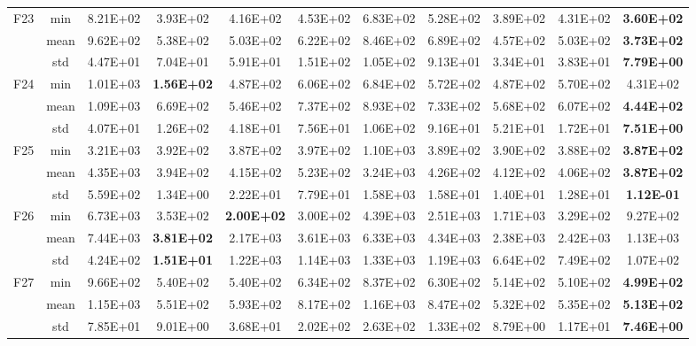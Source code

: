 \documentclass[preprint,review,compress,12pt]{elsarticle}
\begin{document}
\begin{table}[H]
{\begin{tabular}{ccccccccccc}
    \multirow{3}[0]{*}{F23} & min   & 8.21E+02 & 3.93E+02 & 4.16E+02 & 4.53E+02 & 6.83E+02 & 5.28E+02 & 3.89E+02 & 4.31E+02 & \textbf{3.60E+02} \\
          & mean  & 9.62E+02 & 5.38E+02 & 5.03E+02 & 6.22E+02 & 8.46E+02 & 6.89E+02 & 4.57E+02 & 5.03E+02 & \textbf{3.73E+02} \\
          & std   & 4.47E+01 & 7.04E+01 & 5.91E+01 & 1.51E+02 & 1.05E+02 & 9.13E+01 & 3.34E+01 & 3.83E+01 & \textbf{7.79E+00} \\
    \multirow{3}[0]{*}{F24} & min   & 1.01E+03 & \textbf{1.56E+02} & 4.87E+02 & 6.06E+02 & 6.84E+02 & 5.72E+02 & 4.87E+02 & 5.70E+02 & 4.31E+02 \\
          & mean  & 1.09E+03 & 6.69E+02 & 5.46E+02 & 7.37E+02 & 8.93E+02 & 7.33E+02 & 5.68E+02 & 6.07E+02 & \textbf{4.44E+02} \\
          & std   & 4.07E+01 & 1.26E+02 & 4.18E+01 & 7.56E+01 & 1.06E+02 & 9.16E+01 & 5.21E+01 & 1.72E+01 & \textbf{7.51E+00} \\
    \multirow{3}[0]{*}{F25} & min   & 3.21E+03 & 3.92E+02 & 3.87E+02 & 3.97E+02 & 1.10E+03 & 3.89E+02 & 3.90E+02 & 3.88E+02 & \textbf{3.87E+02} \\
          & mean  & 4.35E+03 & 3.94E+02 & 4.15E+02 & 5.23E+02 & 3.24E+03 & 4.26E+02 & 4.12E+02 & 4.06E+02 & \textbf{3.87E+02} \\
          & std   & 5.59E+02 & 1.34E+00 & 2.22E+01 & 7.79E+01 & 1.58E+03 & 1.58E+01 & 1.40E+01 & 1.28E+01 & \textbf{1.12E-01} \\
    \multirow{3}[0]{*}{F26} & min   & 6.73E+03 & 3.53E+02 & \textbf{2.00E+02} & 3.00E+02 & 4.39E+03 & 2.51E+03 & 1.71E+03 & 3.29E+02 & 9.27E+02 \\
          & mean  & 7.44E+03 & \textbf{3.81E+02} & 2.17E+03 & 3.61E+03 & 6.33E+03 & 4.34E+03 & 2.38E+03 & 2.42E+03 & 1.13E+03 \\
          & std   & 4.24E+02 & \textbf{1.51E+01} & 1.22E+03 & 1.14E+03 & 1.33E+03 & 1.19E+03 & 6.64E+02 & 7.49E+02 & 1.07E+02 \\
    \multirow{3}[0]{*}{F27} & min   & 9.66E+02 & 5.40E+02 & 5.40E+02 & 6.34E+02 & 8.37E+02 & 6.30E+02 & 5.14E+02 & 5.10E+02 & \textbf{4.99E+02} \\
          & mean  & 1.15E+03 & 5.51E+02 & 5.93E+02 & 8.17E+02 & 1.16E+03 & 8.47E+02 & 5.32E+02 & 5.35E+02 & \textbf{5.13E+02} \\
          & std   & 7.85E+01 & 9.01E+00 & 3.68E+01 & 2.02E+02 & 2.63E+02 & 1.33E+02 & 8.79E+00 & 1.17E+01 & \textbf{7.46E+00} \\

\end{tabular}}
\end{table}
\end{document}
